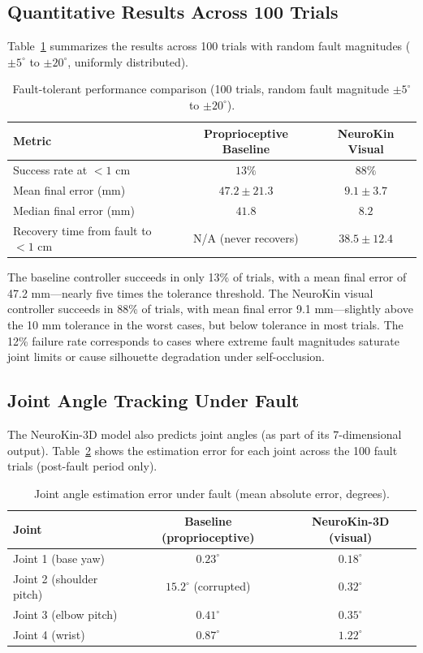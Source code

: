 \documentclass[12pt,a4paper,oneside]{report}
\begin{document}
\subsection{Quantitative Results Across 100 Trials}

Table~\ref{tab:fault_performance} summarizes the results across 100 trials with random fault magnitudes ($\pm5^\circ$ to $\pm20^\circ$, uniformly distributed).

\begin{table}[H]
\centering
\small
\caption{Fault-tolerant performance comparison (100 trials, random fault magnitude $\pm5^\circ$ to $\pm20^\circ$).}
\label{tab:fault_performance}
\begin{tabular}{lcc}
\toprule
\textbf{Metric} & \textbf{Proprioceptive Baseline} & \textbf{NeuroKin Visual} \\
\midrule
Success rate at $<1$ cm & $13\%$ & $88\%$ \\
Mean final error (mm) & $47.2 \pm 21.3$ & $9.1 \pm 3.7$ \\
Median final error (mm) & $41.8$ & $8.2$ \\
Recovery time from fault to $<1$ cm & N/A (never recovers) & $38.5 \pm 12.4$ \\
\bottomrule
\end{tabular}
\end{table}

The baseline controller succeeds in only 13\% of trials, with a mean final error of 47.2 mm---nearly five times the tolerance threshold. The NeuroKin visual controller succeeds in 88\% of trials, with mean final error 9.1 mm---slightly above the 10 mm tolerance in the worst cases, but below tolerance in most trials. The 12\% failure rate corresponds to cases where extreme fault magnitudes saturate joint limits or cause silhouette degradation under self-occlusion.

\subsection{Joint Angle Tracking Under Fault}

The NeuroKin-3D model also predicts joint angles (as part of its 7-dimensional output). Table~\ref{tab:joint_errors} shows the estimation error for each joint across the 100 fault trials (post-fault period only).

\begin{table}[H]
\centering
\caption{Joint angle estimation error under fault (mean absolute error, degrees).}
\label{tab:joint_errors}
\begin{tabular}{lcc}
\toprule
Joint & Baseline (proprioceptive) & NeuroKin-3D (visual) \\
\midrule
Joint 1 (base yaw) & $0.23^\circ$ & $0.18^\circ$ \\
Joint 2 (shoulder pitch) & $15.2^\circ$ (corrupted) & $0.32^\circ$ \\
Joint 3 (elbow pitch) & $0.41^\circ$ & $0.35^\circ$ \\
Joint 4 (wrist) & $0.87^\circ$ & $1.22^\circ$ \\
\bottomrule
\end{tabular}
\end{table}
\end{document}
